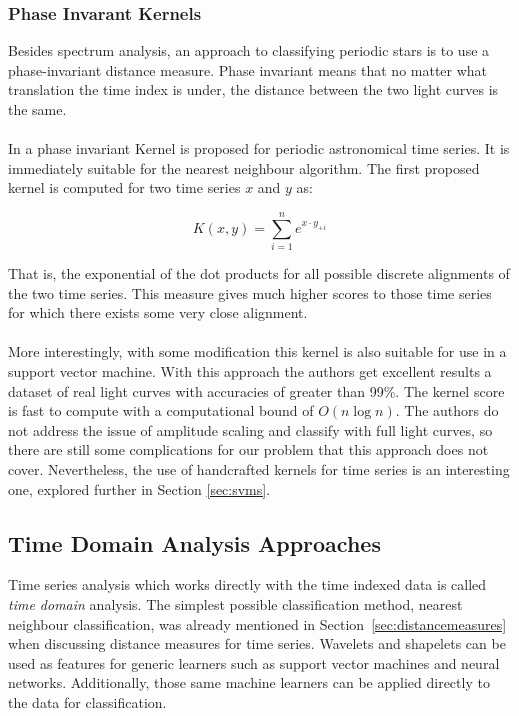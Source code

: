 	
	\subsubsection{Phase Invarant Kernels}
	Besides spectrum analysis, an approach to classifying periodic stars is to use a phase-invariant distance measure. Phase invariant means that no matter what translation the time index is under, the distance between the two light curves is the same.
	\paragraph{}
	In \citep{wachman2009kernels} a phase invariant Kernel is proposed for periodic astronomical time series. It is immediately suitable for the nearest neighbour algorithm. The first proposed kernel is computed for two time series $x$ and $y$ as:
	\begin{center}
	\begin{equation*}
		K(x,y) = \sum\limits_{i=1}^{n}e^{ x \cdot y_{+i}}
	\end{equation*}
	\end{center}
	That is, the exponential of the dot products for all possible discrete alignments of the two time series. 	This measure gives much higher scores to those time series for which there exists some very close alignment.
	\paragraph{}
	More interestingly, with some modification this kernel is also suitable for use in a support vector machine. With this approach the authors get excellent results a dataset of real light curves with accuracies of greater than 99\%. The kernel score is fast to compute with a computational bound of $O(n\log n)$. The authors do not address the issue of amplitude scaling and classify with full light curves, so there are still some complications for our problem that this approach does not cover. Nevertheless, the use of handcrafted kernels for time series is an interesting one, explored further in Section \ref{sec:svms}.
	
	\subsection{Time Domain Analysis Approaches}
	Time series analysis which works directly with the time indexed data is called \emph{time domain} analysis. The simplest possible classification method, nearest neighbour classification, was already mentioned in Section~\ref{sec:distancemeasures} when discussing distance measures for time series. Wavelets and shapelets can be used as features for generic learners such as support vector machines and neural networks. Additionally, those same machine learners can be applied directly to the data for classification.

